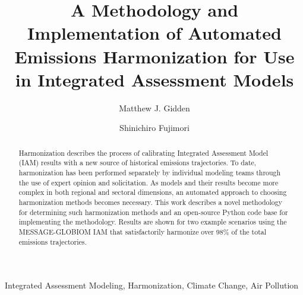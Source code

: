 

\begin{frontmatter}

\title{A Methodology and Implementation of Automated Emissions Harmonization for Use in Integrated Assessment Models}

\author[iiasa]{Matthew J. Gidden}

\author[iiasa,nies]{Shinichiro Fujimori}

\address[iiasa]{International Institute for Applied Systems Analysis,
  Schlossplatz 1, A-2361 Laxenburg, Austria}
\address[nies]{National Institute for Environmental Studies, Tsukuba, Japan}

\begin{abstract}
Harmonization describes the process of calibrating Integrated Assessment Model
(IAM) results with a new source of historical emissions trajectories. To date,
harmonization has been performed separately by individual modeling teams through
the use of expert opinion and solicitation. As models and their results become
more complex in both regional and sectoral dimensions, an automated approach to
choosing harmonization methods becomes necessary. This work describes a novel
methodology for determining such harmonization methods and an open-source Python
code base for implementing the methodology. Results are shown for two example
scenarios using the MESSAGE-GLOBIOM IAM that satisfactorily harmonize over 98\%
of the total emissions trajectories. \cite{Dirac1953888}
\end{abstract}

\begin{keyword}
Integrated Assessment Modeling, Harmonization, Climate Change, Air Pollution 
\end{keyword}

\end{frontmatter}

\linenumbers
